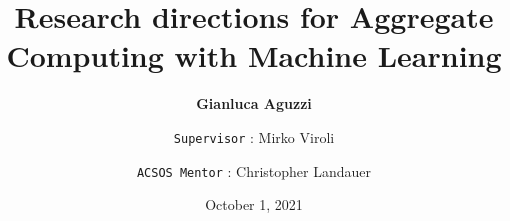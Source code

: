 \title{Research directions for Aggregate Computing with
Machine Learning}
\author[G. Aguzzi]{
  \textbf{Gianluca Aguzzi} \and
  \texttt{Supervisor} : Mirko Viroli  \and
  \texttt{ACSOS Mentor} : Christopher Landauer
}

\date{October 1, 2021}